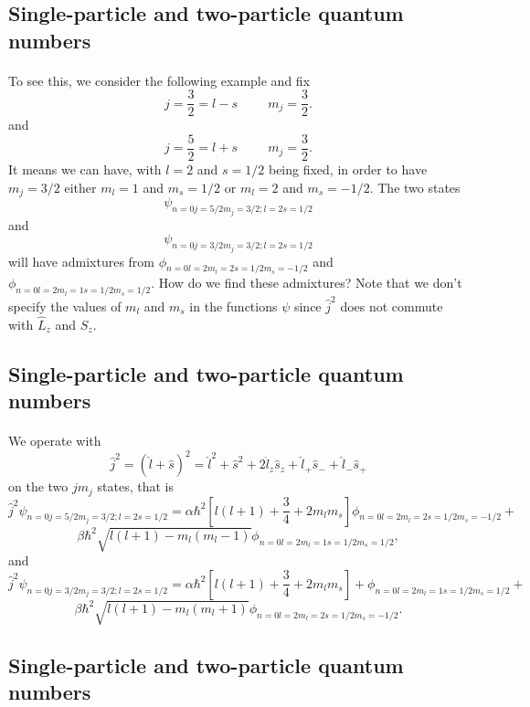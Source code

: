 \documentclass[%
twoside,                 %
final,                   %
10pt]{article}
\begin{document}
\subsection*{Single-particle and two-particle quantum numbers}

\paragraph{}
To see this, we consider the following example and fix
\[
j=\frac{3}{2}=l-s\hspace{1cm} m_j=\frac{3}{2}.
\]
and
\[
j=\frac{5}{2}=l+s\hspace{1cm} m_j=\frac{3}{2}.
\]
It means we can have, with $l=2$ and $s=1/2$ being fixed, in order to have $m_j=3/2$ either $m_l=1$ and $m_s=1/2$ or
$m_l=2$ and $m_s=-1/2$. The two states    
\[
\psi_{n=0j=5/2m_j=3/2;l=2s=1/2}
\]
and
\[
\psi_{n=0j=3/2m_j=3/2;l=2s=1/2}
\]
will have admixtures from $\phi_{n=0l=2m_l=2s=1/2m_s=-1/2}$ and $\phi_{n=0l=2m_l=1s=1/2m_s=1/2}$. 
How do we find these admixtures? Note that we don't specify the values of $m_l$ and $m_s$ 
in the functions $\psi$ since    
$\hat{j}^2$ does not commute with $\hat{L}_z$ and $\hat{S}_z$.



\subsection*{Single-particle and two-particle quantum numbers}

\paragraph{}
We operate with 
\[
   \hat{j}^2=(\hat{l}+\hat{s})^2=\hat{l}^2+\hat{s}^2+2\hat{l}_z\hat{s}_z+\hat{l}_+\hat{s}_{-}+\hat{l}_{-}\hat{s}_{+}
\]
on the two $jm_j$ states, that is
\[
\hat{j}^2\psi_{n=0j=5/2m_j=3/2;l=2s=1/2}= \alpha\hbar^2[l(l+1)+\frac{3}{4}+2m_lm_s]\phi_{n=0l=2m_l=2s=1/2m_s=-1/2}+
\]
\[
\beta\hbar^2\sqrt{l(l+1)-m_l(m_l-1)}\phi_{n=0l=2m_l=1s=1/2m_s=1/2},
\]
and
\[
\hat{j}^2\psi_{n=0j=3/2m_j=3/2;l=2s=1/2}= \alpha\hbar^2[l(l+1)+\frac{3}{4}+2m_lm_s]+ \phi_{n=0l=2m_l=1s=1/2m_s=1/2}+
\]
\[
\beta\hbar^2\sqrt{l(l+1)-m_l(m_l+1)}\phi_{n=0l=2m_l=2s=1/2m_s=-1/2}.
\]



\subsection*{Single-particle and two-particle quantum numbers}
\end{document}
